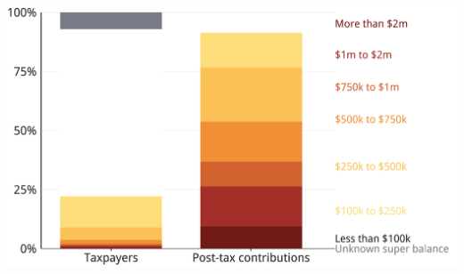 \documentclass[tikz]{standalone}\usepackage[]{graphicx}\usepackage[]{color}
\newenvironment{knitrout}{}{} %
\begin{document}
\begin{knitrout}
\color{fgcolor}
\includegraphics[width=12.1in,height=7.00in]{./Super-tax-targeting/b5-super-atlas/Figure5-2-1} 

\end{knitrout}
\end{document}
